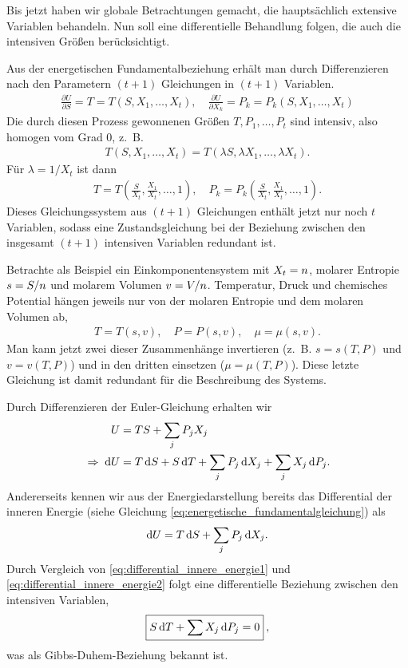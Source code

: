 Bis jetzt haben wir globale Betrachtungen gemacht, die hauptsächlich extensive Variablen behandeln. Nun soll eine differentielle Behandlung folgen, die auch die intensiven Größen berücksichtigt.

Aus der energetischen Fundamentalbeziehung erhält man durch Differenzieren nach den Parametern $(t+1)$ Gleichungen in $(t+1)$ Variablen.
\begin{align*}
    \frac{\partial U}{\partial S} = T = T(S,X_1,\ldots ,X_t), \quad
    \frac{\partial U}{\partial X_k} =P_k = P_k(S,X_1,\ldots ,X_t)
\end{align*}
Die durch diesen Prozess gewonnenen Größen $T,P_1,\ldots,P_t$ sind intensiv, also homogen vom Grad $0$, z.~B.
\begin{align*}
    T(S,X_1,\ldots ,X_t)=T(\lambda S,\lambda X_1,\ldots ,\lambda X_t).
\end{align*}
Für $\lambda=1/X_t$ ist dann
\begin{align*}
    T = T\left(\frac{S}{X_t},\frac{X_1}{X_t},\ldots ,1\right), \quad P_k=P_k\left(\frac{S}{X_t},\frac{X_1}{X_t},\ldots ,1\right).
\end{align*}
Dieses Gleichungssystem aus $(t+1)$ Gleichungen enthält jetzt nur noch $t$ Variablen, sodass eine Zustandsgleichung bei der Beziehung zwischen den insgesamt $(t+1)$ intensiven Variablen redundant ist.

Betrachte als Beispiel ein Einkomponentensystem mit $X_t=n$, molarer Entropie $s=S/n$ und molarem Volumen $v=V/n$. Temperatur, Druck und chemisches Potential hängen jeweils nur von der molaren Entropie und dem molaren Volumen ab,
\begin{align*}
    T=T(s,v), \quad P=P(s,v), \quad \mu=\mu(s,v).
\end{align*}
Man kann jetzt zwei dieser Zusammenhänge invertieren (z.~B. $s=s(T,P)$ und $v=v(T,P)$) und in den dritten einsetzen ($\mu=\mu(T,P)$). Diese letzte Gleichung ist damit redundant für die Beschreibung des Systems.

Durch Differenzieren der Euler-Gleichung erhalten wir
\begin{align}
    U                    & =TS+ \sum_j P_jX_j                                                 \nonumber \\
    \label{eq:differential_innere_energie1}
    \;\Rightarrow\; \mathop{}\!\mathrm{d} U & = T\mathop{}\!\mathrm{d} S + S\mathop{}\!\mathrm{d} T + \sum_j P_j\mathop{}\!\mathrm{d} X_j + \sum_j X_j\mathop{}\!\mathrm{d} P_j.
\end{align}
Andererseits kennen wir aus der Energiedarstellung bereits das Differential der inneren Energie (siehe Gleichung \eqref{eq:energetische_fundamentalgleichung}) als
\begin{align}
    \label{eq:differential_innere_energie2}
    \mathop{}\!\mathrm{d} U = T\mathop{}\!\mathrm{d} S + \sum_j P_j \mathop{}\!\mathrm{d} X_j.
\end{align}
Durch Vergleich von \eqref{eq:differential_innere_energie1} und \eqref{eq:differential_innere_energie2} folgt eine differentielle Beziehung zwischen den intensiven Variablen,
\begin{align}
    \label{eq:gibbs_duhem}
    \boxed{
        S\mathop{}\!\mathrm{d} T + \sum X_j \mathop{}\!\mathrm{d} P_j = 0
    }\:,
\end{align}
was als Gibbs-Duhem-Beziehung bekannt ist.

